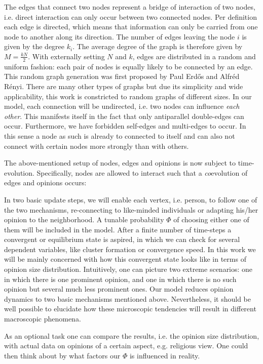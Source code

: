 \documentclass[11pt]{article}
\begin{document}
The edges that connect two nodes represent a bridge of interaction of two nodes, i.e. direct interaction can only occur between two connected nodes. Per definition each edge is directed, which means that information can only be carried from one node to another along its direction. The number of edges leaving the node $i$ is given by the degree $k_i$. The average degree of the graph is therefore given by $M=\frac{kN}{2}$. With externally setting $N$ and $k$, edges are distributed in a random and uniform fashion: each pair of nodes is equally likely to be connected by an edge. This random graph generation was first proposed by Paul Erdős and Alfréd Rényi.\cite{Erdos} There are many other types of graphs but due its simplicity and wide applicability, this work is constricted to random graphs of different sizes. In our model, each connection will be undirected, i.e. two nodes can influence \textit{each other}. This manifests itself in the fact that only antiparallel double-edges can occur. Furthermore, we have forbidden self-edges and multi-edges to occur. In this sense a node as such is already to connected to itself and can also not connect with certain nodes more strongly than with others. 



The above-mentioned setup of nodes, edges and opinions is now subject to time-evolution. Specifically, nodes are allowed to interact such that a \textit{co}evolution of edges and opinions occurs: 

In two basic update steps, we will enable each vertex, i.e. person, to follow one of the two mechanisms, re-connecting to like-minded individuals or adapting his/her opinion to the neighborhood. A tunable probability $\Phi$ of choosing either one of them will be included in the model. After a finite number of time-steps a convergent or equilibrium state is aspired, in which we can check for several dependent variables, like cluster formation or convergence speed. In this work we will be mainly concerned with how this convergent state looks like in terms of opinion size distribution. Intuitively, one can picture two extreme scenarios: one in which there is one prominent opinion, and one in which there is no such opinion but several much less prominent ones. Our model reduces opinion dynamics to two basic mechanisms mentioned above. Nevertheless, it should be well possible to elucidate how these microscopic tendencies will result in different macroscopic phenomena.

As an optional task one can compare the results, i.e. the opinion size distribution, with actual data on opinions of a certain aspect, e.g. religious view. One could then think about by what factors our $\Phi$ is influenced in reality.
\end{document}
